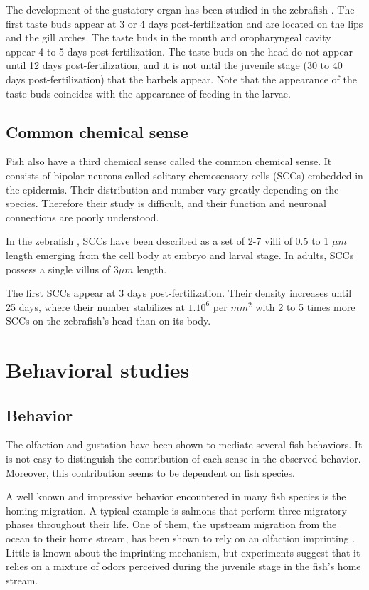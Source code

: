     The development of the gustatory organ has been studied in the zebrafish \cite{hansen2002taste}. The first taste buds appear at 3 or 4 days post-fertilization and are located on the lips and the gill arches. The taste buds in the mouth and oropharyngeal cavity appear 4 to 5 days post-fertilization. The taste buds on the head do not appear until 12 days post-fertilization, and it is not until the juvenile stage (30 to 40 days post-fertilization) that the barbels appear. Note that the appearance of the taste buds coincides with the appearance of feeding in the larvae.

    \subsection{Common chemical sense}
    Fish also have a third chemical sense called the common chemical sense. It consists of bipolar neurons called solitary chemosensory cells (SCCs) embedded in the epidermis. Their distribution and number vary greatly depending on the species. Therefore their study is difficult, and their function and neuronal connections are poorly understood.

    In the zebrafish \cite{kotrschal1997ontogeny}, SCCs have been described as a set of 2-7 villi of 0.5 to 1 $\mu m$ length emerging from the cell body at embryo and larval stage.  In adults, SCCs possess a single villus of $3\mu m$ length.

    The first SCCs appear at 3 days post-fertilization. Their density increases until 25 days, where their number stabilizes at $1.10^6$ per $mm^2$ with 2 to 5 times more SCCs on the zebrafish's head than on its body.


  \section{Behavioral studies}
    \subsection{Behavior}
    The olfaction and gustation have been shown to mediate several fish behaviors. It is not easy to distinguish the contribution of each sense in the observed behavior. Moreover, this contribution seems to be dependent on fish species.

    A well known and impressive behavior encountered in many fish species is the homing migration. A typical example is salmons that perform three migratory phases throughout their life. One of them, the upstream migration from the ocean to their home stream, has been shown to rely on an olfaction imprinting \cite{stabell1992olfactory,hasler1983olfactory}. Little is known about the imprinting mechanism, but experiments suggest that it relies on a mixture of odors perceived during the juvenile stage in the fish's home stream.

